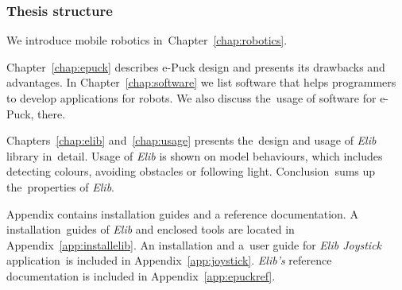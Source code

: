   \subsubsection*{Thesis structure}
  We introduce mobile robotics in~Chapter~\ref{chap:robotics}.

  Chapter~\ref{chap:epuck} describes e-Puck design and presents its drawbacks and advantages.
  In Chapter~\ref{chap:software} we list software that 
  helps programmers to develop applications for robots.
  We also discuss the~usage of software for e-Puck, there. 
  
  Chapters~\ref{chap:elib} and~\ref{chap:usage} presents the~design 
  and usage of {\it Elib} library in~detail.
  Usage of {\it Elib} is shown on model behaviours, which includes 
  detecting colours, avoiding obstacles or following light.
  Conclusion~sums up the~properties of {\it Elib}.

  Appendix contains installation guides and a reference documentation. 
  A installation~guides of {\it Elib} and enclosed tools are located in Appendix~\ref{app:installelib}. 
  An installation and a~user guide for {\it Elib Joystick} application~is included in Appendix~\ref{app:joystick}. 
  {\it Elib's} reference documentation is included in Appendix~\ref{app:epuckref}.


